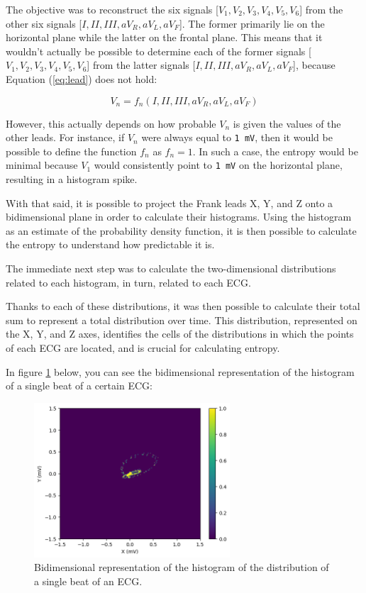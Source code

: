 \documentclass[12pt,italian]{report}
\begin{document}
The objective was to reconstruct the six signals [$ V_{1}, V_{2}, V_{3}, V_{4}, V_{5}, V_{6} $] from the other six signals [$ I, II, III, aV_{R}, aV_{L}, aV_{F} $]. The former primarily lie on the horizontal plane while the latter on the frontal plane. This means that it wouldn't actually be possible to determine each of the former signals [$ V_{1}, V_{2}, V_{3}, V_{4}, V_{5}, V_{6} $] from the latter signals [$ I, II, III, aV_{R}, aV_{L}, aV_{F} $], because Equation (\ref{eq:lead}) does not hold:

\begin{equation}
    V_{n} = f_{n}(I, II, III, aV_{R}, aV_{L}, aV_{F})
    \label{eq:lead}
\end{equation}

However, this actually depends on how probable $ V_{n} $ is given the values of the other leads. For instance, if $ V_{n} $ were always equal to \texttt{1 mV}, then it would be possible to define the function $ f_{n} $ as $ f_{n} = 1 $. In such a case, the entropy would be minimal because $ V_{1} $ would consistently point to \texttt{1 mV} on the horizontal plane, resulting in a histogram spike.

With that said, it is possible to project the Frank leads X, Y, and Z onto a bidimensional plane in order to calculate their histograms. Using the histogram as an estimate of the probability density function, it is then possible to calculate the entropy to understand how predictable it is.

The immediate next step was to calculate the two-dimensional distributions related to each histogram, in turn, related to each ECG.

Thanks to each of these distributions, it was then possible to calculate their total sum to represent a total distribution over time. This distribution, represented on the X, Y, and Z axes, identifies the cells of the distributions in which the points of each ECG are located, and is crucial for calculating entropy.

In figure \ref{fig:histogram_single_beat} below, you can see the bidimensional representation of the histogram of a single beat of a certain ECG:

\begin{figure}[H]
    \centering
    \includegraphics[width=0.65\textwidth]{images/histogram_single_beat.png}
    \captionsetup{justification=centering}
    \caption{Bidimensional representation of the histogram of the distribution of a single beat of an ECG.}
    \label{fig:histogram_single_beat}
\end{figure}
\end{document}
